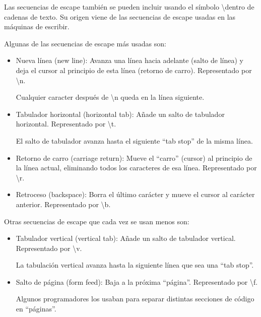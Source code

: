 \documentclass{report}
\newcommand{\doble}[1]{``#1''}
\begin{document}
Las secuencias de escape también se pueden incluir usando el símbolo \textbackslash dentro de cadenas de texto. Su origen viene de las secuencias de escape usadas en las máquinas de escribir.

Algunas de las secuencias de escape más usadas son:

\begin{itemize}
  \item Nueva línea (new line): Avanza una línea hacia adelante (salto de línea) y deja el cursor al principio de esta línea (retorno de carro). Representado por \textbackslash n.
  
  
  Cualquier caracter después de \textbackslash n queda en la línea siguiente.

  \item Tabulador horizontal (horizontal tab): Añade un salto de tabulador horizontal. Representado por \textbackslash t.
  
  
  El salto de tabulador avanza hasta el siguiente \doble{tab stop} de la misma línea.

  \item Retorno de carro (carriage return): Mueve el \doble{carro} (cursor) al principio de la línea actual, eliminando todos los caracteres de esa línea. Representado por \textbackslash r.
  

  \item Retroceso (backspace): Borra el último carácter y mueve el cursor al carácter anterior. Representado por \textbackslash b.
  

\end{itemize}

Otras secuencias de escape que cada vez se usan menos son:

\begin{itemize}
  \item Tabulador vertical (vertical tab): Añade un salto de tabulador vertical. Representado por \textbackslash v.
  

  La tabulación vertical avanza hasta la siguiente línea que sea una \doble{tab stop}.

  \item Salto de página (form feed): Baja a la próxima \doble{página}. Representado por \textbackslash f.
  
  
  Algunos programadores los usaban para separar distintas secciones de código en \doble{páginas}.

\end{itemize}
\end{document}
